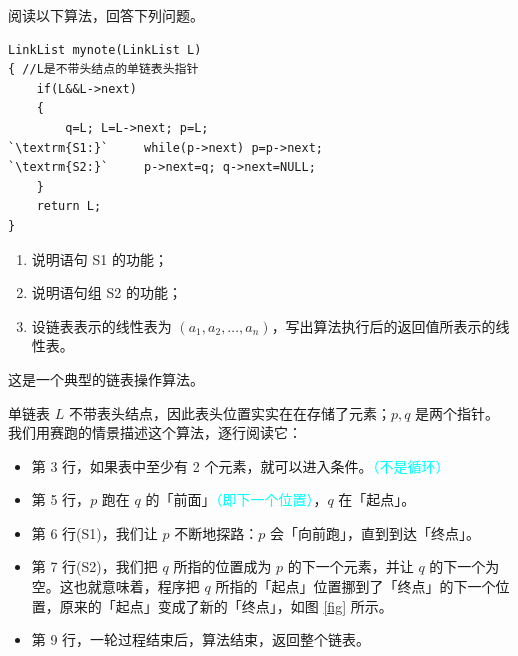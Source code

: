 \documentclass[UTF8]{ctexart}
\begin{document}
{\color{cyan!50!black} 阅读以下算法，回答下列问题。 }
\begin{lstlisting}
LinkList mynote(LinkList L)
{ //L是不带头结点的单链表头指针
    if(L&&L->next)
    {
        q=L; L=L->next; p=L;
`\textrm{S1:}`     while(p->next) p=p->next;
`\textrm{S2:}`     p->next=q; q->next=NULL;
    }
    return L;
}
\end{lstlisting}

\begin{enumerate}[itemsep=0pt,parsep=0pt]
\color{cyan!50!black}
    \item 说明语句 S1 的功能；
    \item 说明语句组 S2 的功能；
    \item 设链表表示的线性表为 $(a_1,a_2,\dots,a_n)$，写出算法执行后的返回值所表示的线性表。
\end{enumerate}

这是一个典型的链表操作算法。\textcolor{cyan}{}

单链表 $L$ 不带表头结点，因此表头位置实实在在存储了元素；$p,q$ 是两个指针。我们用赛跑的情景描述这个算法，逐行阅读它：

\begin{itemize}
    \item 第 3 行，如果表中至少有 2 个元素，就可以进入条件。\textcolor{cyan}{（不是循环）}
    \item 第 5 行，$p$ 跑在 $q$ 的「前面」\textcolor{cyan}{（即下一个位置）}，$q$ 在「起点」。
    \item 第 6 行(S1)，我们让 $p$ 不断地探路：$p$ 会「向前跑」，直到到达「终点」。
    \item 第 7 行(S2)，我们把 $q$ 所指的位置成为 $p$ 的下一个元素，并让 $q$ 的下一个为空。这也就意味着，程序把 $q$ 所指的「起点」位置挪到了「终点」的下一个位置，原来的「起点」变成了新的「终点」，如图 \ref{fig} 所示。
    \item 第 9 行，一轮过程结束后，算法结束，返回整个链表。
\end{itemize}
\end{document}

